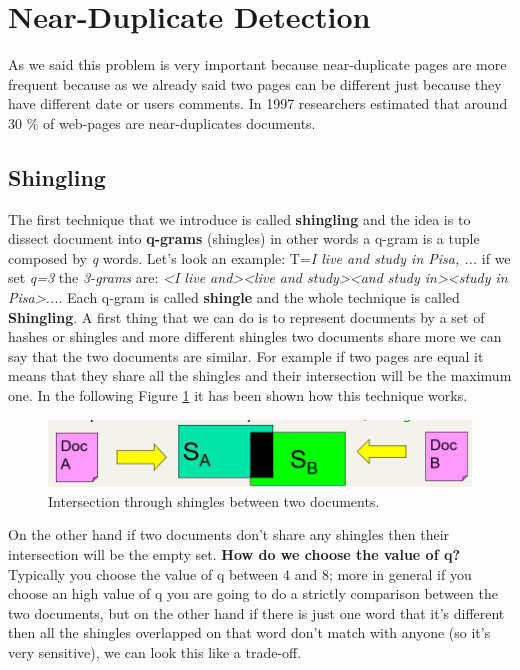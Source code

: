 \section{Near-Duplicate Detection}
As we said this problem is very important because near-duplicate pages are more frequent because as we already said two pages can be different just because they have different date or users comments. In 1997 researchers estimated that around 30 \% of web-pages are near-duplicates documents.\newline
\subsection{Shingling}
The first technique that we introduce is called \textbf{shingling} and the idea is to dissect document into \textbf{q-grams} (shingles) in other words a q-gram is a tuple composed by \textit{q} words.\newline
Let's look an example: T={\textit{I live and study in Pisa, ...}} if we set \textit{q=3} the \textit{3-grams} are: \textit{<I live and><live and study><and study in><study in Pisa>...}. Each q-gram is called \textbf{shingle} and the whole technique is called \textbf{Shingling}.\newline
A first thing that we can do is to represent documents by a set of hashes or shingles and more different shingles two documents share more we can say that the two documents are similar. For example if two pages are equal it means that they share all the shingles and their intersection will be the maximum one.\newline
In the following Figure \ref{fig:shingling} it has been shown how this technique works.
\begin{figure}
    \centering
    \includegraphics[width=0.75\linewidth]{images/shingling.png}
    \caption{Intersection through shingles between two documents.}
    \label{fig:shingling}
\end{figure}
On the other hand if two documents don't share any shingles then their intersection will be the empty set.\newline
\textbf{How do we choose the value of q?} Typically you choose the value of q between 4 and 8; more in general if you choose an high value of q you are going to do a strictly comparison between the two documents, but on the other hand if there is just one word that it's different then all the shingles overlapped on that word don't match with anyone (so it's very sensitive), we can look this like a trade-off.\newline
